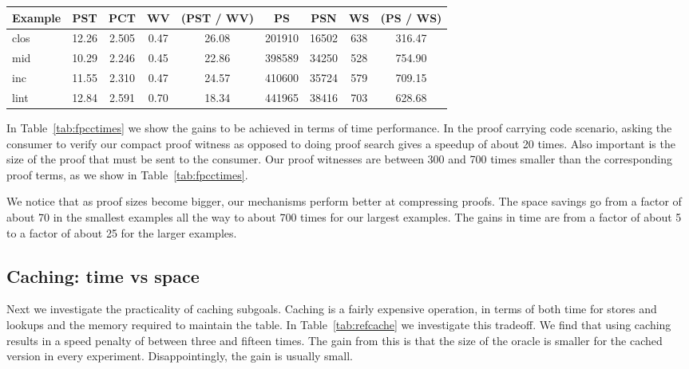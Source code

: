\documentclass{llncs}
\begin{document}
\begin{table*}[htbp]
\begin{center}
\begin{small}
\begin{tabular}{|l|c|c|c|c|c|c|c|c|}
\hline
Example & PST & PCT & WV & (PST / WV) & PS & PSN & WS & (PS / WS)\\
\hline
clos & 12.26 & 2.505 & 0.47 & 26.08& 201910 & 16502 & 638 & 316.47\\
mid & 10.29 & 2.246 & 0.45 & 22.86& 398589 & 34250 & 528 & 754.90\\
inc & 11.55 & 2.310 & 0.47 & 24.57& 410600 & 35724 & 579 & 709.15\\
lint & 12.84 & 2.591 & 0.70 & 18.34& 441965 & 38416 & 703 & 628.68\\
\hline
\end{tabular}
\end{small}
\end{center}
\caption{\label{tab:fpcctimes}
FPCC: Times without Caching}
\end{table*}

In Table~\ref{tab:fpcctimes} we show the gains to be achieved in terms
of time performance. In the proof carrying code scenario, asking the
consumer to verify our compact proof witness as opposed to doing proof
search gives a speedup of about 20 times. Also important is the size
of the proof that must be sent to the consumer. Our proof witnesses
are between 300 and 700 times smaller than the corresponding proof
terms, as we show in Table~\ref{tab:fpcctimes}.

We notice that as proof sizes become bigger, our mechanisms perform
better at compressing proofs.  The space savings go from a factor of
about 70 in the smallest examples all the way to about 700 times for
our largest examples. The gains in time are from a factor of about 5
to a factor of about 25 for the larger examples.

\subsection{Caching: time vs space}
Next we investigate the practicality of caching subgoals. Caching is a
fairly expensive operation, in terms of both time for stores and
lookups and the memory required to maintain the table. In
Table~\ref{tab:refcache} we investigate this tradeoff. We find that
using caching results in a speed penalty of between three and fifteen
times. The gain from this is that the size of the oracle is smaller
for the cached version in every experiment. Disappointingly, the gain
is usually small.
\end{document}
